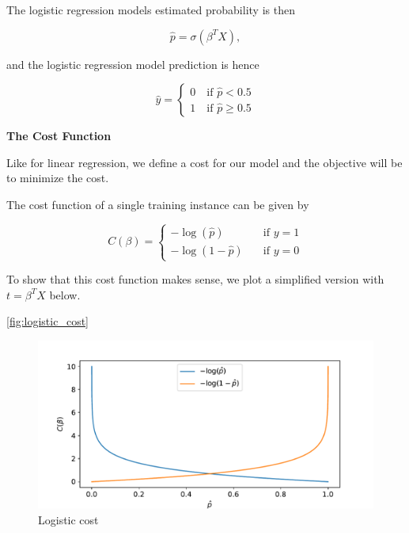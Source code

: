 The logistic regression models estimated probability is then

\begin{equation}
    \hat{p} = \sigma (\beta^T X),
\end{equation}

and the logistic regression model prediction is hence

\begin{equation}
\hat{y} = \begin{cases} 0 \quad \text{if } \hat{p} < 0.5 \\ 1 \quad \text{if } \hat{p} \geq 0.5 \end{cases} 
\end{equation}

\textbf{The Cost Function}

Like for linear regression, we define a cost for our model and the objective will be to minimize the cost.

The cost function of a single training instance can be given by

\begin{equation}
    C(\beta) = \begin{cases} - \log(\hat{p}) &\quad \text{if } y=1 \\ - \log(1-\hat{p}) &\quad \text{if } y=0  \end{cases}
\end{equation}

To show that this cost function makes sense, we plot a simplified version with $t=\beta^T X$ below.

\autoref{fig:logistic_cost}

\begin{figure}[H]
\begin{center}\includegraphics[scale=0.6]{latex/figures/logistic_cost_func.pdf}
\end{center}
\caption{Logistic cost}
\label{fig:logistic_cost}
\end{figure}

